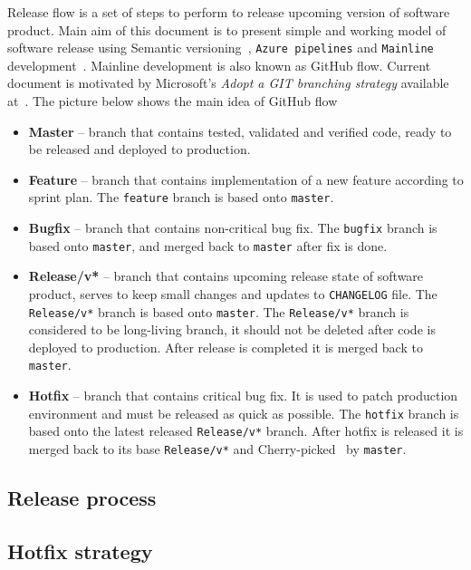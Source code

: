 Release flow is a set of steps to perform to release upcoming version of software product.
Main aim of this document is to present simple and working model of software release
using Semantic versioning~\cite{SemanticVersioning}, \texttt{Azure pipelines}
and \texttt{Mainline} development~\cite{MainlineDevelopment}.
Mainline development is also known as GitHub flow.
Current document is motivated by Microsoft's
\textit{Adopt a GIT branching strategy} available at~\cite{AdoptGitStrategy}.
The picture below shows the main idea of GitHub flow

\begin{itemize}
    \item \textbf{Master} -- branch that contains tested, validated and verified code, ready to be released and deployed to production.
    \item \textbf{Feature} -- branch that contains implementation of a new feature according to sprint plan.
    The \texttt{feature} branch is based onto \texttt{master}.
    \item \textbf{Bugfix} -- branch that contains non-critical bug fix.
    The \texttt{bugfix} branch is based onto \texttt{master}, and merged back to \texttt{master} after fix is done.
    \item \textbf{Release/v*} -- branch that contains upcoming release state of software product, serves to keep small changes
    and updates to \texttt{CHANGELOG} file.
    The \texttt{Release/v*} branch is based onto \texttt{master}.
    The \texttt{Release/v*} branch is considered to be long-living branch, it should not be deleted after code is deployed to production.
    After release is completed it is merged back to \texttt{master}.
    \item \textbf{Hotfix} -- branch that contains critical bug fix.
    It is used to patch production environment and must be released as quick as possible.
    The \texttt{hotfix} branch is based onto the latest released \texttt{Release/v*} branch.
    After hotfix is released it is merged back to its base \texttt{Release/v*} and Cherry-picked~\cite{CherryPick}
    by \texttt{master}.
\end{itemize}

\subsection{Release process}\label{subsec:release-process}


\subsection{Hotfix strategy}\label{subsec:hotfix-strategy}

